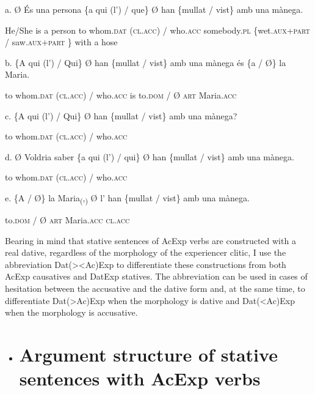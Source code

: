 \documentclass[output=paper,modfonts,nonflat]{langsci/langscibook}
\begin{document}
         a. Ø         És una persona \{a  qui              (l’)           / que\}        Ø                    han \{mullat        / vist\}                     amb una mànega.

                He/She is  a     person    to whom.\textsc{dat} (\textsc{cl.acc}) / who.\textsc{acc} somebody.\textsc{pl} \{wet.\textsc{aux}+\textsc{part} / saw.\textsc{aux}+\textsc{part} \} with  a    hose

          b. \{A qui             (l’)          / Qui\}       Ø han \{mullat / vist\} amb una mànega és \{a          / Ø\} la   Maria.

               to whom.\textsc{dat} (\textsc{cl.acc}) / who.\textsc{acc}                                                                is  to.\textsc{dom} / Ø \textsc{art} Maria.\textsc{acc}

        c. \{A  qui             (l’)          / Qui\}       Ø han \{mullat / vist\} amb una mànega?

              to whom.\textsc{dat} (\textsc{cl.acc}) / who.\textsc{acc}

          d. Ø Voldria saber \{a  qui              (l’)          / qui\}        Ø han \{mullat / vist\} amb una mànega.

                                          to whom.\textsc{dat} (\textsc{cl.acc}) / who.\textsc{acc}

        e. \{A         / Ø\} la    Maria\textsubscript{(},\textsubscript{)}     Ø l’         han \{mullat / vist\} amb una mànega.

             to.\textsc{dom} / Ø   \textsc{art} Maria.\textsc{acc}   \textsc{cl.acc}

Bearing in mind that stative sentences of AcExp verbs are constructed with a real dative, regardless of the morphology of the experiencer clitic, I use the abbreviation Dat(>{\textbar}<Ac)Exp to differentiate these constructions from both AcExp causatives and DatExp statives. The abbreviation can be used in cases of hesitation between the accusative and the dative form and, at the same time, to differentiate Dat(>Ac)Exp when the morphology is dative and Dat(<Ac)Exp when the morphology is accusative.

\begin{itemize}
\item \section{Argument structure of stative sentences with AcExp verbs}
\end{itemize}
\end{document}
